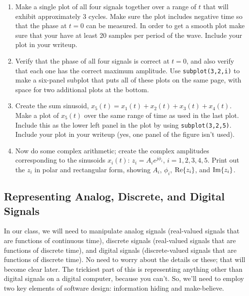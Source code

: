 \begin{enumerate}\renewcommand{\theenumi}{\alph{enumi}}
\item Make a single plot of all four signals together over a range of
  $t$ that will exhibit approximately 3 cycles. Make sure the plot
  includes negative time so that the phase at $t = 0$ can be
  measured. In order to get a smooth plot make sure that your have at
  least 20 samples per period of the wave. Include your plot in your
  writeup.

\item Verify that the phase of all four signals is correct at $t = 0$,
  and also verify that each one has the correct maximum amplitude. Use
  \texttt{subplot(3,2,i)} to make a six-panel subplot that puts all of
  these plots on the same page, with space for two additional plots at
  the bottom.

\item Create the sum sinusoid,
  $x_5(t)=x_1(t)+x_2(t)+x_3(t)+x_4(t)$. Make a plot of $x_5(t)$ over
  the same range of time as used in the last plot. Include this as the
  lower left panel in the plot by using
  \texttt{subplot(3,2,5)}. Include your plot in your writeup (yes, one
  panel of the figure isn't used).

\item Now do some complex arithmetic; create the complex amplitudes
  corresponding to the sinusoids $x_i(t)$: $z_i = A_ie^{j\phi_i}$,
  $i=1,2,3,4,5$. Print out the $z_i$ in polar and rectangular form,
  showing $A_i$, $\phi_i$, $\operatorname{Re}\{z_i\}$, and $\operatorname{Im}\{z_i\}$.
\end{enumerate}


\subsection{Representing Analog, Discrete, and Digital Signals}

In our class, we will need to manipulate analog signals (real-valued
signals that are functions of continuous time), discrete signals
(real-valued signals that are functions of discrete time), and digital
signals (discrete-valued signals that are functions of discrete
time). No need to worry about the details or these; that will become
clear later. The trickiest part of this is representing anything other
than digital signals on a digital computer, because you can't. So,
we'll need to employ two key elements of software design: information
hiding and make-believe.

